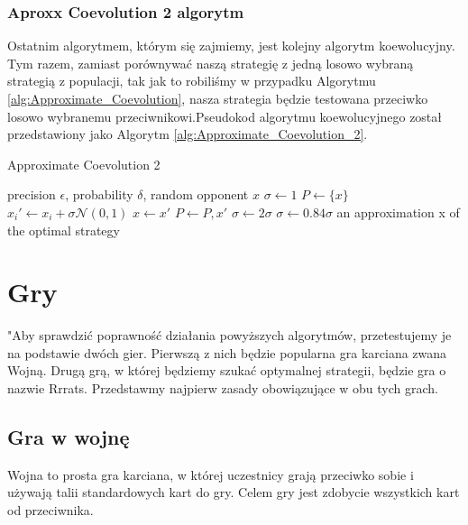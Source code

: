 \documentclass[inzynierska]{pwr_wmat_praca_dyplomowa}
\theoremstyle{plain}
\numberwithin{theorem}{chapter}
\theoremstyle{definition}
\numberwithin{theorem}{chapter}
\begin{document}
	\subsection{Aproxx Coevolution 2 algorytm}
	Ostatnim algorytmem, którym się zajmiemy, jest kolejny algorytm koewolucyjny. Tym razem, zamiast porównywać naszą strategię z jedną losowo wybraną strategią z populacji, tak jak to robiliśmy w przypadku Algorytmu \ref{alg:Approximate_Coevolution}, nasza strategia będzie testowana przeciwko losowo wybranemu przeciwnikowi.Pseudokod algorytmu koewolucyjnego został przedstawiony jako Algorytm \ref{alg:Approximate_Coevolution_2}. 

	\begin{algorithm}\captionsetup{labelformat=custom2}
		\caption{Approximate Coevolution 2}\label{alg:Approximate_Coevolution_2}
		\begin{algorithmic}
			\Ensure  precision $\epsilon$, probability $\delta$, random opponent $x$
			\State $\sigma \gets 1 $ 
			\State $P \gets \{ x \}$ 
			\State $x_i' \gets x_i + \sigma \mathcal{N}(0,1)$ 
			\EndFor
			\State $x \gets x'$
			\State $P \gets {P,x'}$
			\State $\sigma \gets 2\sigma$
			\Else
			\State $\sigma \gets 0.84 \sigma$
			\EndIf
			\EndWhile
			\State \Return an approximation x of the optimal strategy
		\end{algorithmic}
	\end{algorithm}
	
	\chapter{Gry}
	"Aby sprawdzić poprawność działania powyższych algorytmów, przetestujemy je na podstawie dwóch gier. Pierwszą z nich będzie popularna gra karciana zwana Wojną. Drugą grą, w której będziemy szukać optymalnej strategii, będzie gra o nazwie Rrrats. Przedstawmy najpierw zasady obowiązujące w obu tych grach.

	\section{Gra w wojnę}
	Wojna to prosta gra karciana, w której uczestnicy grają przeciwko sobie i używają talii standardowych kart do gry. Celem gry jest zdobycie wszystkich kart od przeciwnika.
	
\end{document}
